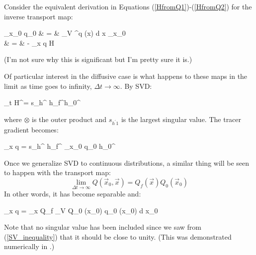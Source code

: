 Consider the equivalent derivation in Equations (\ref{HfromQ1})-(\ref{HfromQ2})
for the inverse transport map:
\begin{eqanl}
	\nabla_{\vec x_0} q_0 & = & \int_V \vec \delta^\prime {} q (\vec x)
	\mathrm d \vec x \cdot \nabla_{\vec x_0} \Phi \\
	& = & - \nabla_{\vec x} q \cdot H 
\end{eqanl}
(I'm not sure why this is significant but I'm pretty sure it is.)


Of particular interest in the diffusive case
is what happens to these maps in the limit as time
goes to infinity, $\Delta t \rightarrow \infty$.
By SVD:
\begin{eqnl}
	\lim_{\Delta t \rightarrow \infty} H^\prime = 
	s_{h^} \vec h_f^\prime \otimes \vec h_0^\prime
\end{eqnl}
where $\otimes$ is the outer product and $s_{h^\prime1}$ is the largest 
singular value. The tracer gradient becomes:
\begin{eqnl}
	\nabla_{\vec x} q = s_{h^} \vec h_f^\prime
	\nabla_{\vec x_0} q_0 \cdot \vec h_0^\prime
\end{eqnl}

Once we generalize SVD to continuous distributions, a similar thing will
be seen to happen with the transport map:
\begin{equation}
	\lim_{\Delta t \rightarrow \infty} Q(\vec x_0, \vec x) =
	Q_f (\vec x) Q_0 (\vec x_0)
	\label{transport_map_separable}
\end{equation}
In other words, it has become separable and:
\begin{eqnl}
	\nabla_{\vec x} q = \nabla_{\vec x} Q_f \int_V Q_0 (\vec x_0) q_0 (\vec x_0) \mathrm d \vec x_0
\end{eqnl}
Note that no singular value has been included since we saw from
(\ref{SV_inequality}) that it should be close to unity.
(This was demonstrated numerically in \citet{Mills2018}.)


